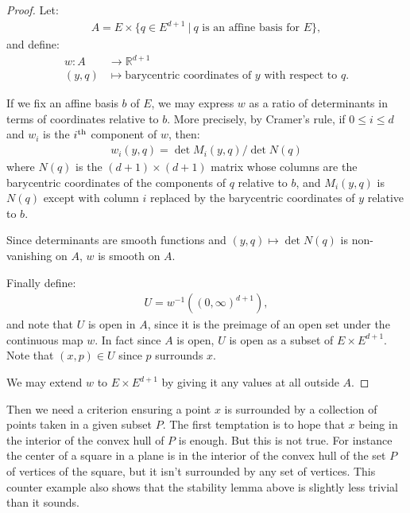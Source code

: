 \documentclass[10pt,a4paper]{article}
\newcommand{\co}{\!:}
\newcommand{\leanok}{}
\begin{document}
\begin{proof}
  \leanok
  Let:
  \begin{align*}
    A = E \times \{ q \in E^{d+1} ~|~ \mbox{$q$ is an affine basis for $E$} \},
  \end{align*}
  and define:
  \begin{align*}
    w \co A &\to ℝ^{d+1}\\
    (y, q) &\mapsto \mbox{barycentric coordinates of $y$ with respect to $q$}.
  \end{align*}

  If we fix an affine basis $b$ of $E$, we may express $w$ as a
  ratio of determinants in terms of coordinates relative to $b$. More precisely,
  by Cramer's rule, if $0 \le i \le d$ and $w_i$ is the $i^{\rm th}$ component of $w$,
  then:
  \begin{align*}
    w_i (y, q) = \det M_i (y, q) / \det N (q)
  \end{align*}
  where $N(q)$ is the $(d+1)\times (d+1)$ matrix whose columns are the barycentric
  coordinates of the components of $q$ relative to $b$, and $M_i (y, q)$ is $N(q)$
  except with column $i$ replaced by the barycentric coordinates of $y$ relative
  to $b$.

  Since determinants are smooth functions and $(y, q) \mapsto \det N(q)$ is
  non-vanishing on $A$, $w$ is smooth on $A$.

  Finally define:
  \begin{align*}
    U = w^{-1}((0, \infty)^{d+1}),
  \end{align*}
  and note that $U$ is open in $A$, since it is the preimage of an open set under the
  continuous map $w$. In fact since $A$ is open, $U$ is open as a subset of $E \times E^{d+1}$.
  Note that $(x, p) \in U$ since $p$ surrounds $x$.

  We may extend $w$ to $E \times E^{d+1}$ by giving it any values at all outside $A$.
\end{proof}

Then we need a criterion ensuring a point $x$ is surrounded by a collection of points taken
in a given subset $P$. The first temptation is to hope that $x$ being in the interior of
the convex hull of $P$ is enough. But this is not true. For instance the center of a square
in a plane is in the interior of the convex hull of the set $P$ of vertices of the square,
but it isn't surrounded by any set of vertices. This counter example also shows that
the stability lemma above is slightly less trivial than it sounds.
\end{document}
